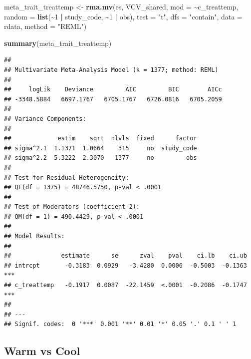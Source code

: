 \documentclass[
]{article}
\newenvironment{Shaded}{\begin{snugshade}}{\end{snugshade}}
\newcommand{\AttributeTok}[1]{\textcolor[rgb]{0.13,0.29,0.53}{#1}}
\newcommand{\DecValTok}[1]{\textcolor[rgb]{0.00,0.00,0.81}{#1}}
\newcommand{\FunctionTok}[1]{\textcolor[rgb]{0.13,0.29,0.53}{\textbf{#1}}}
\newcommand{\NormalTok}[1]{#1}
\newcommand{\OtherTok}[1]{\textcolor[rgb]{0.56,0.35,0.01}{#1}}
\newcommand{\SpecialCharTok}[1]{\textcolor[rgb]{0.81,0.36,0.00}{\textbf{#1}}}
\newcommand{\StringTok}[1]{\textcolor[rgb]{0.31,0.60,0.02}{#1}}
\begin{document}
\begin{Shaded}
\begin{Highlighting}[]
\NormalTok{meta\_trait\_treattemp }\OtherTok{\textless{}{-}} \FunctionTok{rma.mv}\NormalTok{(es, VCV\_shared, }\AttributeTok{mod =} \SpecialCharTok{\textasciitilde{}}\NormalTok{c\_treattemp,}
    \AttributeTok{random =} \FunctionTok{list}\NormalTok{(}\SpecialCharTok{\textasciitilde{}}\DecValTok{1} \SpecialCharTok{|}\NormalTok{ study\_code, }\SpecialCharTok{\textasciitilde{}}\DecValTok{1} \SpecialCharTok{|}\NormalTok{ obs), }\AttributeTok{test =} \StringTok{"t"}\NormalTok{, }\AttributeTok{dfs =} \StringTok{"contain"}\NormalTok{,}
    \AttributeTok{data =}\NormalTok{ rdata, }\AttributeTok{method =} \StringTok{"REML"}\NormalTok{)}
\end{Highlighting}
\end{Shaded}

\begin{Shaded}
\begin{Highlighting}[]
\FunctionTok{summary}\NormalTok{(meta\_trait\_treattemp)}
\end{Highlighting}
\end{Shaded}

\begin{verbatim}
## 
## Multivariate Meta-Analysis Model (k = 1377; method: REML)
## 
##     logLik    Deviance         AIC         BIC        AICc   
## -3348.5884   6697.1767   6705.1767   6726.0816   6705.2059   
## 
## Variance Components:
## 
##             estim    sqrt  nlvls  fixed      factor 
## sigma^2.1  1.1371  1.0664    315     no  study_code 
## sigma^2.2  5.3222  2.3070   1377     no         obs 
## 
## Test for Residual Heterogeneity:
## QE(df = 1375) = 48746.5750, p-val < .0001
## 
## Test of Moderators (coefficient 2):
## QM(df = 1) = 490.4429, p-val < .0001
## 
## Model Results:
## 
##              estimate      se      zval    pval    ci.lb    ci.ub      
## intrcpt       -0.3183  0.0929   -3.4280  0.0006  -0.5003  -0.1363  *** 
## c_treattemp   -0.1917  0.0087  -22.1459  <.0001  -0.2086  -0.1747  *** 
## 
## ---
## Signif. codes:  0 '***' 0.001 '**' 0.01 '*' 0.05 '.' 0.1 ' ' 1
\end{verbatim}

\newpage

\hypertarget{warm-vs-cool}{%
\subsection{Warm vs Cool}\label{warm-vs-cool}}
\end{document}
